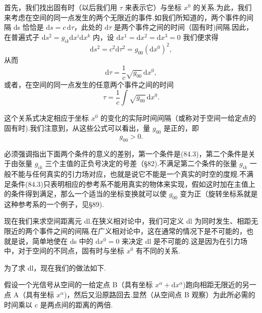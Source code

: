 首先，我们找出固有时（以后我们用 $\tau$ 来表示它）与坐标 $x^0$ 的关系.为此，我们来考虑在空间的同一点发生的两个无限近的事件.如我们所知道的，两个事件的间隔 ds 恰恰是 $\mathrm{d}s=c\,\mathrm{d}\tau$，此处的 $\mathrm{d}\tau$ 是两个事件之间的时间（固有时)间隔.因此，在普遍式子 $\mathrm{d}s^2=g_{ik}\mathrm{d}x^i\mathrm{d}x^k$ 内，设 $\mathrm{d}x^1=\mathrm{d}x^2=\mathrm{d}x^3=0$ 我们便求得
\begin{equation*}
  \mathrm{d}s^2=c^2\mathrm{d}\tau^2
  =g_{00}(\mathrm{d}x^0)^2,
\end{equation*}
从而
\begin{equation}
  \mathrm{d}\tau=\frac{1}{c}\sqrt{g_{00}}\,\mathrm{d}x^0,
\end{equation}
或者，在空间的同一点发生的任意两个事件之间的时间
\begin{equation}
  \tau=\frac{1}{c}\int\sqrt{g_{00}}\,\mathrm{d}x^0.
\end{equation}

这个关系式决定相应于坐标 $x^0$ 的变化的实际时间间隔（或称对于空间一给定点的固有时).我们注意到，从这些公式可以看出，量 $g_{00}$ 是正的，即
\begin{equation}
  g_{00}>0.
\end{equation}

必须强调指出下面两个条件的意义的差别，第一个条件是(84.3)，第二个条件是关于由张量 $g_{ik}$ 三个主值的正负号决定的号差（§82).不满足第二个条件的张量 $g_{ik}$ 一般不能与任何真实的引力场对应，也就是说它不能是一个真实的时空的度规.不满足条件(84.3)只表明相应的参考系不能用真实的物体来实现，假如这时加在主值上的条件得到满足，那么一个适当的坐标变换就可以使 $g_{00}$ 变为正（旋转坐标系就是这种参考系的一个例子，见§89).

现在我们来求空间距离元 dl.在狭义相对论中，我们可定义 dl 为同时发生、相距无限近的两个事件之间的间隔.在广义相对论中，这在通常的情况下是不可能的，也就是说，简单地使在 ds 中的 $\mathrm{d}x^0=0$ 来决定 dl 是不可能的.这是因为在引力场中，对于空间的不同点，固有时与坐标 $x^0$ 有不同的关系.

为了求 dl，现在我们的做法如下.

假设一个光信号从空间的一给定点 B（具有坐标 $x^{\alpha}+\mathrm{d}x^{\alpha}$)跑向相距无限近的另一点 A（具有坐标 $x^{\alpha}$)，然后又沿原路回去.显然（从空间点 B 观察）为此所必需的时间乘以 c 是两点间的距离的两倍.

